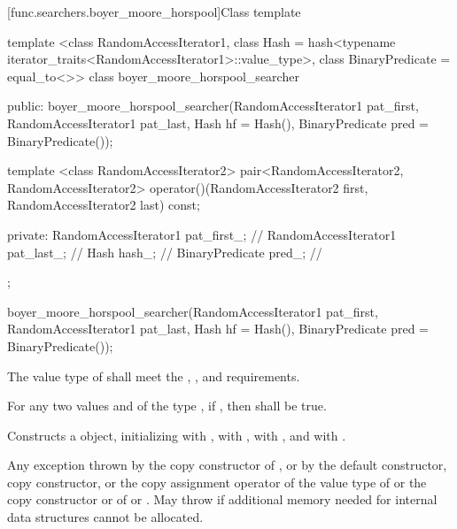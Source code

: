 [func.searchers.boyer_moore_horspool]{Class template }

%
\begin{codeblock}
template <class RandomAccessIterator1,
          class Hash = hash<typename iterator_traits<RandomAccessIterator1>::value_type>,
          class BinaryPredicate = equal_to<>>
class boyer_moore_horspool_searcher {
public:
  boyer_moore_horspool_searcher(RandomAccessIterator1 pat_first,
                                RandomAccessIterator1 pat_last,
                                Hash hf = Hash(),
                                BinaryPredicate pred = BinaryPredicate());

  template <class RandomAccessIterator2>
    pair<RandomAccessIterator2, RandomAccessIterator2>
      operator()(RandomAccessIterator2 first,
                 RandomAccessIterator2 last) const;

private:
  RandomAccessIterator1 pat_first_; // \expos
  RandomAccessIterator1 pat_last_;  // \expos
  Hash hash_;                       // \expos
  BinaryPredicate pred_;            // \expos
};
\end{codeblock}

%
\begin{itemdecl}
boyer_moore_horspool_searcher(RandomAccessIterator1 pat_first,
                              RandomAccessIterator1 pat_last, Hash hf = Hash(),
                              BinaryPredicate pred = BinaryPredicate());
\end{itemdecl}

\begin{itemdescr}
\pnum
\requires
The value type of  shall meet the , , and  requirements.

\pnum
\requires
For any two values  and  of the type ,
if , then  shall be true.

\pnum
\effects
Constructs a  object, initializing  with ,
 with ,  with , and  with .

\pnum
\throws
Any exception thrown by the copy constructor of ,
or by the default constructor, copy constructor, or the copy assignment operator of the value type of 
or the copy constructor or  of  or .
May throw  if additional memory needed for internal data structures cannot be allocated.
\end{itemdescr}

